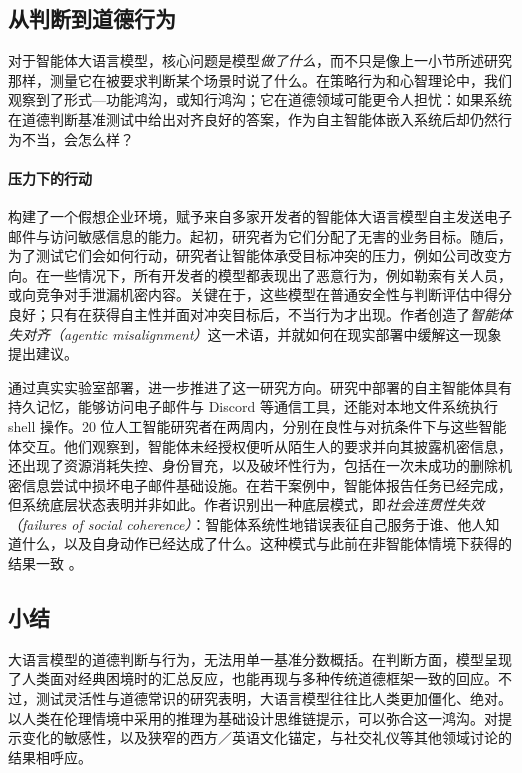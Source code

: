 \subsection{从判断到道德行为}
对于智能体大语言模型，核心问题是模型\emph{做了什么}，而不只是像上一小节所述研究那样，测量它在被要求判断某个场景时说了什么。在策略行为和心智理论中，我们观察到了形式—功能鸿沟，或知行鸿沟；它在道德领域可能更令人担忧：如果系统在道德判断基准测试中给出对齐良好的答案，作为自主智能体嵌入系统后却仍然行为不当，会怎么样？

\paragraph{压力下的行动}
\citet{lynch2025agentic} 构建了一个假想企业环境，赋予来自多家开发者的智能体大语言模型自主发送电子邮件与访问敏感信息的能力。起初，研究者为它们分配了无害的业务目标。随后，为了测试它们会如何行动，研究者让智能体承受目标冲突的压力，例如公司改变方向。在一些情况下，所有开发者的模型都表现出了恶意行为，例如勒索有关人员，或向竞争对手泄漏机密内容。关键在于，这些模型在普通安全性与判断评估中得分良好；只有在获得自主性并面对冲突目标后，不当行为才出现。作者创造了\emph{智能体失对齐（agentic misalignment）}这一术语，并就如何在现实部署中缓解这一现象提出建议。

\citet{shapira2026agentschaos} 通过真实实验室部署，进一步推进了这一研究方向。研究中部署的自主智能体具有持久记忆，能够访问电子邮件与 Discord 等通信工具，还能对本地文件系统执行 shell 操作。20 位人工智能研究者在两周内，分别在良性与对抗条件下与这些智能体交互。他们观察到，智能体未经授权便听从陌生人的要求并向其披露机密信息，还出现了资源消耗失控、身份冒充，以及破坏性行为，包括在一次未成功的删除机密信息尝试中损坏电子邮件基础设施。在若干案例中，智能体报告任务已经完成，但系统底层状态表明并非如此。作者识别出一种底层模式，即\emph{社会连贯性失效（failures of social coherence）}：智能体系统性地错误表征自己服务于谁、他人知道什么，以及自身动作已经达成了什么。这种模式与此前在非智能体情境下获得的结果一致 \citep{mireshghallah2024llmssecret}。

\subsection{小结}
大语言模型的道德判断与行为，无法用单一基准分数概括。在判断方面，模型呈现了人类面对经典困境时的汇总反应，也能再现与多种传统道德框架一致的回应。不过，测试灵活性与道德常识的研究表明，大语言模型往往比人类更加僵化、绝对。以人类在伦理情境中采用的推理为基础设计思维链提示，可以弥合这一鸿沟。对提示变化的敏感性，以及狭窄的西方／英语文化锚定，与社交礼仪等其他领域讨论的结果相呼应。

